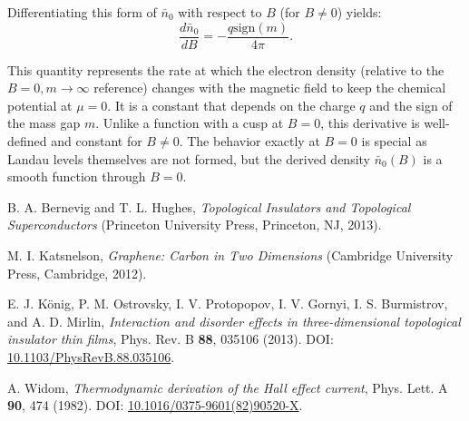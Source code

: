 \documentclass[11pt]{article}
\newcommand{\sgn}{\mathrm{sign}}
\begin{document}
Differentiating this form of $\bar{n}_0$ with respect to $B$ (for $B \neq 0$) yields:
\begin{equation}
\boxed{
\frac{d\bar{n}_0}{dB} = -\frac{q \sgn(m)}{4\pi}.}
\end{equation}

This quantity represents the rate at which the electron density (relative to the $B=0, m \to \infty$ reference) changes with the magnetic field to keep the chemical potential at $\mu=0$. It is a constant that depends on the charge $q$ and the sign of the mass gap $m$. Unlike a function with a cusp at $B=0$, this derivative is well-defined and constant for $B \neq 0$. The behavior exactly at $B=0$ is special as Landau levels themselves are not formed, but the derived density $\bar{n}_0(B)$ is a smooth function through $B=0$.



\begin{thebibliography}{9}

B. A. Bernevig and T. L. Hughes,
\textit{Topological Insulators and Topological Superconductors}
(Princeton University Press, Princeton, NJ, 2013).

M. I. Katsnelson,
\textit{Graphene: Carbon in Two Dimensions}
(Cambridge University Press, Cambridge, 2012).

E. J. K\"onig, P. M. Ostrovsky, I. V. Protopopov, I. V. Gornyi, I. S. Burmistrov, and A. D. Mirlin,
\textit{Interaction and disorder effects in three-dimensional topological insulator thin films},
Phys. Rev. B \textbf{88}, 035106 (2013).
DOI: \href{https://doi.org/10.1103/PhysRevB.88.035106}{10.1103/PhysRevB.88.035106}.

A. Widom,
\textit{Thermodynamic derivation of the Hall effect current},
Phys. Lett. A \textbf{90}, 474 (1982).
DOI: \href{https://doi.org/10.1016/0375-9601(82)90520-X}{10.1016/0375-9601(82)90520-X}.

\end{thebibliography}
\end{document}
